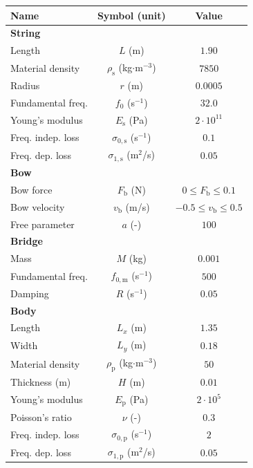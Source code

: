 \documentclass[dvipsnames, pdftex]{article}
\begin{document}
\begin{table}[t]\label{tab:parameters}
\small
\begin{center}
\begin{tabular}{|l|c|c|}
    \hline
    Name & Symbol (unit) & Value\\ \hline
    \multicolumn{3}{|l|}{\bf String}\\ \hline
    Length & $L$ (m) & $1.90$\\
    Material density & $\rho_\text{s}$ (kg$\cdot$m$^{-3}$) & $7850$\\ 
    Radius & $r$ (m) & $0.0005$\\
    Fundamental freq. & $f_0$ (s$^{-1}$)& $32.0$\\ 
    Young's modulus & $E_\text{s}$ (Pa) & $2\cdot 10^{11}$\\
    Freq. indep. loss & $\sigma_{0,\text{s}}$ (s$^{-1}$) & $0.1$\\ 
    Freq. dep. loss & $\sigma_{1,\text{s}}$ (m$^2$/s) & $0.05$\\ \hline
    \multicolumn{3}{|l|}{\bf Bow}\\ \hline
    Bow force & $F_\text{b}$ (N) & $0 \leq F_\text{b} \leq 0.1 $\\
    Bow velocity & $v_\text{b}$ (m/s) & $-0.5 \leq v_\text{b} \leq 0.5 $\\
    Free parameter & $a$ (-) & $100$\\\hline
    \multicolumn{3}{|l|}{\bf Bridge}\\ \hline
    Mass & $M$ (kg) & $0.001$\\ 
    Fundamental freq. & $f_{0,\text{m}}$ (s$^{-1}$) & $500$\\ 
    Damping & $R$ (s$^{-1}$)& $0.05$\\ \hline
    \multicolumn{3}{|l|}{\bf Body}\\ \hline
    Length & $L_x$ (m)& $1.35$\\ 
    Width & $L_y$ (m)& $0.18$\\ 
    Material density & $\rho_\text{p}$ (kg$\cdot$m$^{-3}$)& $50$\\ 
    Thickness (m) & $H$ (m) & $0.01$\\ 
    Young's modulus & $E_\text{p}$ (Pa) & $2\cdot 10^{5}$\\ 
    Poisson's ratio & $\nu$ (-)& $0.3$\\
    Freq. indep. loss & $\sigma_{0,\text{p}}$ (s$^{-1}$)& $2$\\
    Freq. dep. loss & $\sigma_{1,\text{p}}$ (m$^2$/s)& $0.05$\\ \hline

\end{tabular}
\end{center}
\end{table}
\end{document}
